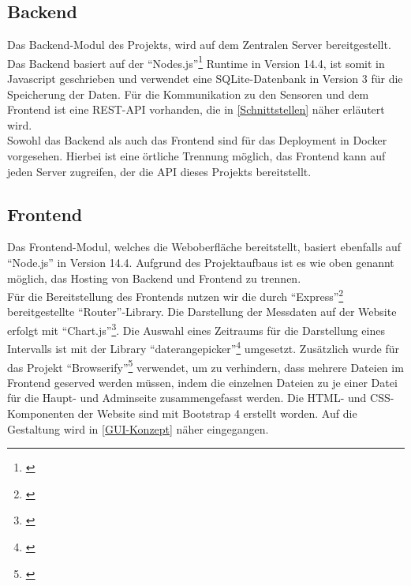 \subsection{Backend} %
Das Backend-Modul des Projekts, wird auf dem Zentralen Server bereitgestellt.
Das Backend basiert auf der \enquote{Nodes.js}\footnote{\cite{nodejs}} Runtime in Version 14.4, ist somit in Javascript geschrieben und verwendet eine SQLite-Datenbank in Version 3 für die Speicherung der Daten.
Für die Kommunikation zu den Sensoren und dem Frontend ist eine REST-API vorhanden, die in \autoref{Schnittstellen} näher erläutert wird.\\
Sowohl das Backend als auch das Frontend sind für das Deployment in Docker vorgesehen.
Hierbei ist eine örtliche Trennung möglich, das Frontend kann auf jeden Server zugreifen, der die API dieses Projekts bereitstellt.

\subsection{Frontend} %
Das Frontend-Modul, welches die Weboberfläche bereitstellt, basiert ebenfalls auf \enquote{Node.js} in Version 14.4.
Aufgrund des Projektaufbaus ist es wie oben genannt möglich, das Hosting von Backend und Frontend zu trennen.\\
Für die Bereitstellung des Frontends nutzen wir die durch \enquote{Express}\footnote{\cite{express.2020}} bereitgestellte \enquote{Router}-Library.
Die Darstellung der Messdaten auf der Website erfolgt mit \enquote{Chart.js}\footnote{\cite{chartjs.2020}}.
Die Auswahl eines Zeitraums für die Darstellung eines Intervalls ist mit der Library \enquote{daterangepicker}\footnote{\cite{daterangepicker.2020}} umgesetzt.
Zusätzlich wurde für das Projekt \enquote{Browserify}\footnote{\cite{browserify.2020}} verwendet, um zu verhindern, dass mehrere Dateien im Frontend geserved werden müssen, indem die einzelnen Dateien zu je einer Datei für die Haupt- und Adminseite zusammengefasst werden.
Die HTML- und CSS-Komponenten der Website sind mit Bootstrap 4 erstellt worden.
Auf die Gestaltung wird in \autoref{GUI-Konzept} näher eingegangen.
